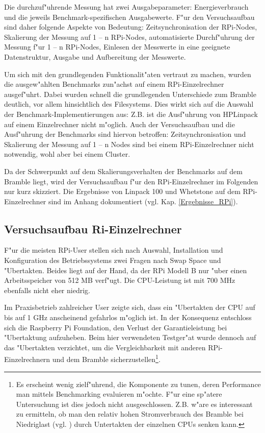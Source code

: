 Die durchzuf"uhrende Messung hat zwei Ausgabeparameter: Energieverbrauch und die jeweils Benchmark-spezifischen Ausgabewerte. F"ur den Versuchsaufbau sind daher folgende Aspekte von Bedeutung: Zeitsynchronisation der RPi-Nodes, Skalierung der Messung auf 1 -- n RPi-Nodes, automatisierte Durchf"uhrung der Messung f"ur 1 -- n RPi-Nodes, Einlesen der Messwerte in eine geeignete Datenstruktur, Ausgabe und Aufbereitung der Messwerte. 

Um sich mit den grundlegenden Funktionalit"aten vertraut zu machen, wurden die ausgew"ahlten Benchmarks zun"achst auf einem RPi-Einzelrechner ausgef"uhrt. Dabei wurden schnell die grundlegenden Unterschiede zum Bramble deutlich, vor allem hinsichtlich des Filesystems. Dies wirkt sich auf die Auswahl der Benchmark-Implementierungen aus: Z.B. ist die Ausf"uhrung von HPLinpack auf einem Einzelrechner nicht m"oglich. Auch der Versuchsaufbau und die Ausf"uhrung der Benchmarks sind hiervon betroffen: Zeitsynchronisation und Skalierung der Messung auf 1 -- n Nodes sind bei einem RPi-Einzelrechner nicht notwendig, wohl aber bei einem Cluster. 

Da der Schwerpunkt auf dem Skalierungsverhalten der Benchmarks auf dem Bramble liegt, wird der Versuchsaufbau f"ur den RPi-Einzelrechner im Folgenden nur kurz skizziert. Die Ergebnisse von Linpack 100 und Whetstone auf dem RPi-Einzelrechner sind im Anhang dokumentiert (vgl. Kap. \ref{Ergebnisse_RPi}).  

\subsection{Versuchsaufbau Ri-Einzelrechner}\label{RPi-Versuchsaufbau}

F"ur die meisten RPi-User stellen sich nach Auswahl, Installation und Konfiguration des Betriebssystems zwei Fragen nach Swap Space und "Ubertakten. Beides liegt auf der Hand, da der RPi Modell B nur "uber einen Arbeitsspeicher von 512 MB verf"ugt. Die CPU-Leistung ist mit 700 MHz ebenfalls nicht eher niedrig. 

Im Praxisbetrieb zahlreicher User zeigte sich, dass ein "Ubertakten der CPU auf bis auf 1 GHz anscheinend gefahrlos m"oglich ist. In der Konsequenz entschloss sich die Raspberry Pi Foundation, den Verlust der Garantieleistung bei "Ubertaktung aufzuheben. Beim hier verwendeten Testger"at wurde dennoch auf das "Ubertakten verzichtet, um die Vergleichbarkeit mit anderen RPi-Einzelrechnern und dem Bramble sicherzustellen\footnote{Es erscheint wenig zielf"uhrend, die Komponente zu tunen, deren Performance man mittels Benchmarking evaluieren m"ochte. F"ur eine sp"atere Untersuchung ist dies jedoch nicht ausgeschlossen. Z.B. w"are es interessant zu ermitteln, ob man den relativ hohen Stromverbrauch des Bramble bei Niedriglast (vgl. \cite{kli13}) durch Untertakten der einzelnen CPUs senken kann.}.

